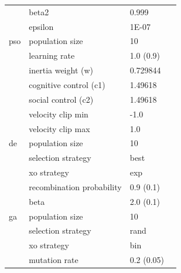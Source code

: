 \documentclass[preprint,review,12pt]{elsarticle}
\begin{document}
\begin{table}[htbp]
{\begin{tabular}{llll}
			                   & beta2                     & 0.999          &                            \\
			                   & epsilon                   & 1E-07          &                            \\
			pso                & population size           & 10             & \citep{ref:van:2010}       \\
			                   & learning rate             & 1.0 (0.9)      &                            \\
			                   & inertia weight (w)        & 0.729844       &                            \\
			                   & cognitive control (c1)    & 1.49618        &                            \\
			                   & social control (c2)       & 1.49618        &                            \\
			                   & velocity clip min         & -1.0           &                            \\
			                   & velocity clip max         & 1.0            &                            \\
			de                 & population size           & 10             & \citep{ref:mezura:2006}    \\
			                   & selection strategy        & best           &                            \\
			                   & xo strategy               & exp            &                            \\
			                   & recombination probability & 0.9 (0.1)      &                            \\
			                   & beta                      & 2.0 (0.1)      &                            \\
			ga                 & population size           & 10             & \citep{ref:lambora:2019}   \\
			                   & selection strategy        & rand           &                            \\
			                   & xo strategy               & bin            &                            \\
			                   & mutation rate             & 0.2 (0.05)     &                            \\
		\end{tabular}%
	}
\end{table}%
\end{document}
